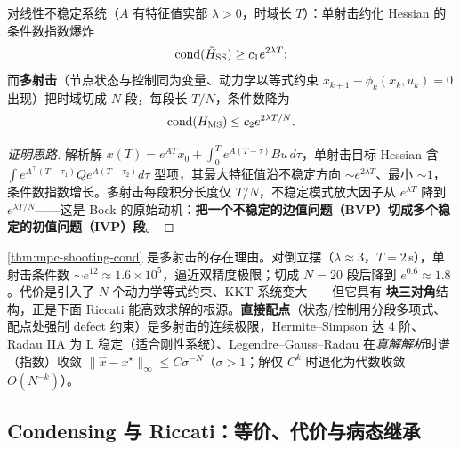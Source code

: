 \begin{theorem}
\label{thm:mpc-shooting-cond}
对线性不稳定系统（$A$ 有特征值实部 $\lambda>0$，时域长 $T$）：单射击约化 Hessian 的条件数指数爆炸
\begin{equation}
  \mathrm{cond}(\tilde H_{\rm SS})\ge c_1e^{2\lambda T};
  \label{eq:mpc-ss-cond}
\end{equation}
而\textbf{多射击}（节点状态与控制同为变量、动力学以等式约束 $x_{k+1}-\phi_k(x_k,u_k)=0$ 出现）把时域切成 $N$ 段，每段长 $T/N$，条件数降为
\begin{equation}
  \mathrm{cond}(H_{\rm MS})\le c_2e^{2\lambda T/N}.
  \label{eq:mpc-ms-cond}
\end{equation}
\end{theorem}

\begin{proof}[证明思路]
解析解 $x(T)=e^{AT}x_0+\int_0^Te^{A(T-\tau)}Bu\,d\tau$，单射击目标 Hessian 含 $\int e^{A^\top(T-\tau_1)}Qe^{A(T-\tau_2)}d\tau$ 型项，其最大特征值沿不稳定方向 $\sim e^{2\lambda T}$、最小 $\sim1$，条件数指数增长。多射击每段积分长度仅 $T/N$，不稳定模式放大因子从 $e^{\lambda T}$ 降到 $e^{\lambda T/N}$——这是 Bock 的原始动机：\textbf{把一个不稳定的边值问题（BVP）切成多个稳定的初值问题（IVP）段}。
\end{proof}

\begin{insight}
\cref{thm:mpc-shooting-cond} 是多射击的存在理由。对倒立摆（$\lambda\approx3$，$T=2$\,s），单射击条件数 $\sim e^{12}\approx1.6\times10^5$，逼近双精度极限；切成 $N=20$ 段后降到 $e^{0.6}\approx1.8$。代价是引入了 $N$ 个动力学等式约束、KKT 系统变大——但它具有 \textbf{块三对角}结构，正是下面 Riccati 能高效求解的根源。\textbf{直接配点}（状态/控制用分段多项式、配点处强制 defect 约束）是多射击的连续极限，Hermite--Simpson 达 4 阶、Radau IIA 为 L 稳定（适合刚性系统）、Legendre--Gauss--Radau 在\emph{真解解析}时谱（指数）收敛 $\|\hat x-x^\star\|_\infty\le C\sigma^{-N}$（$\sigma>1$；解仅 $C^k$ 时退化为代数收敛 $O(N^{-k})$）。
\end{insight}

\subsection{Condensing 与 Riccati：等价、代价与病态继承}
\label{sec:mpc-condensing}
